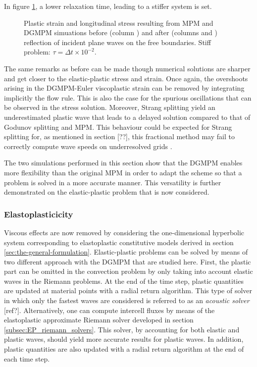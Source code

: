 In figure \ref{fig:siff_elastoviscoplastic_RP}, a lower relaxation time, leading to a stiffer system is set.
\begin{figure}[h!]
  \centering
  { \label{subfig:evp_stiff1}}
  { \label{subfig:evp_stiff2}}
  { \label{subfig:evp_stiff3}}
  {}
  \caption{Plastic strain and longitudinal stress resulting from MPM and DGMPM simuations before (column ) and after (columns  and ) reflection of incident plane waves on the free boundaries. Stiff problem: $\tau=\Delta t \times 10^{-2}$.}
  \label{fig:siff_elastoviscoplastic_RP}
\end{figure}
The same remarks as before can be made though numerical solutions are sharper and get closer to the elastic-plastic stress and strain. Once again, the overshoots arising in the DGMPM-Euler viscoplastic strain can be removed by integrating implicitly the flow rule. This is also the case for the spurious oscillations that can be observed in the stress solution. Moreover, Strang splitting yield an underestimated plastic wave that leads to a delayed solution compared to that of Godunov splitting and MPM. This behaviour could be expected for Strang splitting for, as mentioned in section [??], this fractional method may fail to correctly compute wave speeds on underresolved grids \cite{Thomas_EVP}. 

The two simulations performed in this section show that the DGMPM enables more flexibility than the original MPM in order to adapt the scheme so that a problem is solved in a more accurate manner. This versatility is further demonstrated on the elastic-plastic problem that is now considered.

\subsubsection{Elastoplasticicity}
Viscous effects are now removed by considering the one-dimensional hyperbolic system corresponding to elastoplastic constitutive models derived in section \ref{sec:the-general-formulation}. Elastic-plastic problems can be solved by means of two different approach with the DGMPM that are studied here. First, the plastic part can be omitted in the convection problem by only taking into account elastic waves in the Riemann problems. At the end of the time step, plastic quantities are updated at material points with a radial return algorithm. This type of solver in which only the fastest waves are considered is referred to as an \textit{acoustic solver} [ref?].
Alternatively, one can compute intercell fluxes by means of the elastoplastic approximate Riemann solver developed in section \ref{subsec:EP_riemann_solvers}. This solver, by accounting for both elastic and plastic waves, should yield more accurate results for plastic waves. In addition, plastic quantities are also updated with a radial return algorithm at the end of each time step.

